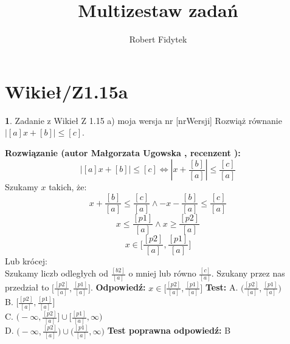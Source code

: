 \documentclass[12pt, a4paper]{article}
\title{Multizestaw zadań}
\author{Robert Fidytek}
\date{}
\theoremstyle{definition} %
\newtheorem{zad}{}
\newcommand{\kategoria}[1]{\section{#1}} %
\newcommand{\zadStart}[1]{\begin{zad}#1\newline} %
\newcommand{\zadStop}{\end{zad}}   %
\newcommand{\rozwStart}[2]{\noindent \textbf{Rozwiązanie (autor #1 , recenzent #2): }\newline} %
\newcommand{\rozwStop}{\newline}                                            %
\newcommand{\odpStart}{\noindent \textbf{Odpowiedź:}\newline}    %
\newcommand{\odpStop}{\newline}                                             %
\newcommand{\testStart}{\noindent \textbf{Test:}\newline} %
\newcommand{\testStop}{\newline} %
\newcommand{\kluczStart}{\noindent \textbf{Test poprawna odpowiedź:}\newline} %
\newcommand{\kluczStop}{\newline} %
\begin{document}
\maketitle


\kategoria{Wikieł/Z1.15a}
\zadStart{Zadanie z Wikieł Z 1.15 a) moja wersja nr [nrWersji]}
Rozwiąż równanie $|[a]x + [b]| \leq [c]$.
\zadStop
\rozwStart{Małgorzata Ugowska}{}
$$|[a]x + [b]| \leq [c] \Leftrightarrow |x + \frac{[b]}{[a]}| \leq \frac{[c]}{[a]}$$ 
Szukamy $x$ takich, że:
$$x + \frac{[b]}{[a]} \leq \frac{[c]}{[a]} \land -x - \frac{[b]}{[a]}\leq \frac{[c]}{[a]}$$
$$x  \leq \frac{[p1]}{[a]}  \land x \geq \frac{[p2]}{[a]}$$
$$x \in \big[\frac{[p2]}{[a]},\frac{[p1]}{[a]}\big]$$
Lub krócej:\\
Szukamy liczb odległych od $\frac{[b2]}{[a]}$ o mniej lub równo $\frac{[c]}{[a]}$. Szukany przez nas przedział to $\big[\frac{[p2]}{[a]},\frac{[p1]}{[a]}\big]$.
\rozwStop
\odpStart
$x \in \big[\frac{[p2]}{[a]},\frac{[p1]}{[a]}\big]$
\odpStop
\testStart
A. $\big(\frac{[p2]}{[a]},\frac{[p1]}{[a]}\big)$\\
B. $\big[\frac{[p2]}{[a]},\frac{[p1]}{[a]}\big]$\\
C. $\big(-\infty,\frac{[p2]}{[a]}\big] \cup \big[\frac{[p1]}{[a]},\infty\big)$\\
D. $\big(-\infty,\frac{[p2]}{[a]}\big) \cup \big(\frac{[p1]}{[a]},\infty\big)$
\testStop
\kluczStart
B
\kluczStop
\end{document}
